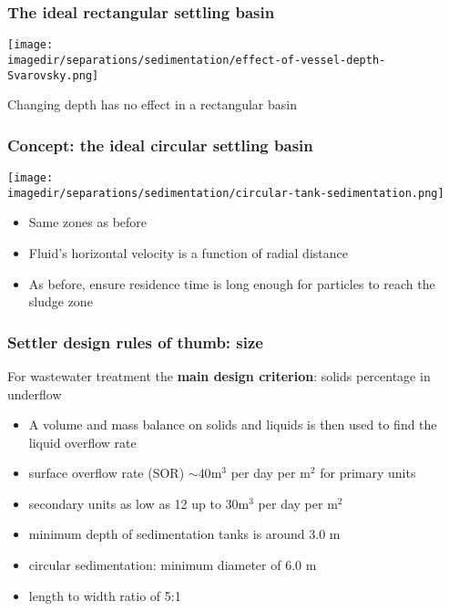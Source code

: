 \begin{frame}\frametitle{The ideal rectangular settling basin}
	\begin{center}
		\texttt{[image: \\imagedir/separations/sedimentation/effect-of-vessel-depth-Svarovsky.png]}
	\end{center}
	Changing depth has no effect in a rectangular basin 
\end{frame}

% 

\begin{frame}\frametitle{Concept: the ideal circular settling basin}

	\begin{center}
		\texttt{[image: \\imagedir/separations/sedimentation/circular-tank-sedimentation.png]}
	\end{center}
	\begin{itemize}
		\item	Same zones as before
		\item	Fluid's {\color{myOrange}horizontal velocity} is a function of radial distance
		\item	As before, ensure residence time is long enough for particles to reach the sludge zone
	\end{itemize}
\end{frame}

\begin{frame}\frametitle{Settler design rules of thumb: size}

	For wastewater treatment the \textbf{main design criterion}: solids percentage in underflow
	\begin{itemize}
		\item	A volume and mass balance on solids and liquids is then used to find the liquid overflow rate
		\item	surface overflow rate (SOR) $\sim 40 \text{m}^3$ per day per $\text{m}^2$ for primary units
		\item	secondary units as low as 12 up to $30 \text{m}^3$ per day per $\text{m}^2$
		\item	minimum depth of sedimentation tanks is around 3.0 m
		\item	circular sedimentation: minimum diameter of 6.0 m
		\item	length to width ratio of 5:1
	\end{itemize}
\end{frame}


